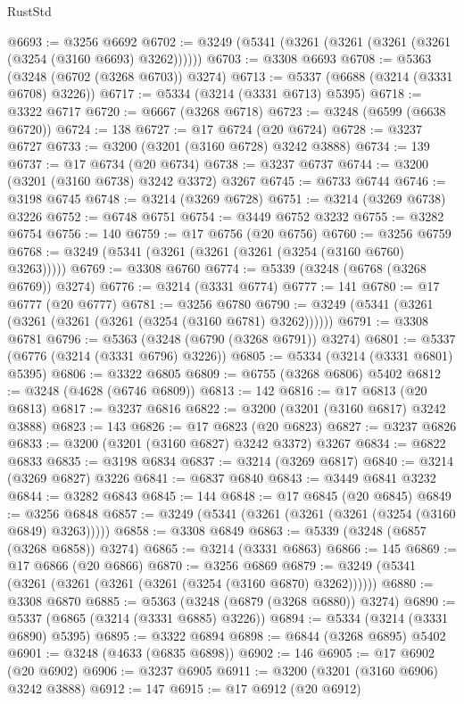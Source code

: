 \begin{lexlean}{RustStd}
\begin{coremodule}
{\begin{coremodule}
{{{{{{{{{{{{{{{{{{{{{{{{{@6693 := @3256 @6692
@6702 := @3249 (@5341 (@3261 (@3261 (@3261 (@3261 (@3254 (@3160 @6693) @3262))))))
@6703 := @3308 @6693
@6708 := @5363 (@3248 (@6702 (@3268 @6703)) @3274)
@6713 := @5337 (@6688 (@3214 (@3331 @6708) @3226))
@6717 := @5334 (@3214 (@3331 @6713) @5395)
@6718 := @3322 @6717
@6720 := @6667 (@3268 @6718)
@6723 := @3248 (@6599 (@6638 @6720))
@6724 := 138
@6727 := @17 @6724 (@20 @6724)
@6728 := @3237 @6727
@6733 := @3200 (@3201 (@3160 @6728) @3242 @3888)
@6734 := 139
@6737 := @17 @6734 (@20 @6734)
@6738 := @3237 @6737
@6744 := @3200 (@3201 (@3160 @6738) @3242 @3372) @3267
@6745 := @6733 @6744
@6746 := @3198 @6745
@6748 := @3214 (@3269 @6728)
@6751 := @3214 (@3269 @6738) @3226
@6752 := @6748 @6751
@6754 := @3449 @6752 @3232
@6755 := @3282 @6754
@6756 := 140
@6759 := @17 @6756 (@20 @6756)
@6760 := @3256 @6759
@6768 := @3249 (@5341 (@3261 (@3261 (@3261 (@3254 (@3160 @6760) @3263)))))
@6769 := @3308 @6760
@6774 := @5339 (@3248 (@6768 (@3268 @6769)) @3274)
@6776 := @3214 (@3331 @6774)
@6777 := 141
@6780 := @17 @6777 (@20 @6777)
@6781 := @3256 @6780
@6790 := @3249 (@5341 (@3261 (@3261 (@3261 (@3261 (@3254 (@3160 @6781) @3262))))))
@6791 := @3308 @6781
@6796 := @5363 (@3248 (@6790 (@3268 @6791)) @3274)
@6801 := @5337 (@6776 (@3214 (@3331 @6796) @3226))
@6805 := @5334 (@3214 (@3331 @6801) @5395)
@6806 := @3322 @6805
@6809 := @6755 (@3268 @6806) @5402
@6812 := @3248 (@4628 (@6746 @6809))
@6813 := 142
@6816 := @17 @6813 (@20 @6813)
@6817 := @3237 @6816
@6822 := @3200 (@3201 (@3160 @6817) @3242 @3888)
@6823 := 143
@6826 := @17 @6823 (@20 @6823)
@6827 := @3237 @6826
@6833 := @3200 (@3201 (@3160 @6827) @3242 @3372) @3267
@6834 := @6822 @6833
@6835 := @3198 @6834
@6837 := @3214 (@3269 @6817)
@6840 := @3214 (@3269 @6827) @3226
@6841 := @6837 @6840
@6843 := @3449 @6841 @3232
@6844 := @3282 @6843
@6845 := 144
@6848 := @17 @6845 (@20 @6845)
@6849 := @3256 @6848
@6857 := @3249 (@5341 (@3261 (@3261 (@3261 (@3254 (@3160 @6849) @3263)))))
@6858 := @3308 @6849
@6863 := @5339 (@3248 (@6857 (@3268 @6858)) @3274)
@6865 := @3214 (@3331 @6863)
@6866 := 145
@6869 := @17 @6866 (@20 @6866)
@6870 := @3256 @6869
@6879 := @3249 (@5341 (@3261 (@3261 (@3261 (@3261 (@3254 (@3160 @6870) @3262))))))
@6880 := @3308 @6870
@6885 := @5363 (@3248 (@6879 (@3268 @6880)) @3274)
@6890 := @5337 (@6865 (@3214 (@3331 @6885) @3226))
@6894 := @5334 (@3214 (@3331 @6890) @5395)
@6895 := @3322 @6894
@6898 := @6844 (@3268 @6895) @5402
@6901 := @3248 (@4633 (@6835 @6898))
@6902 := 146
@6905 := @17 @6902 (@20 @6902)
@6906 := @3237 @6905
@6911 := @3200 (@3201 (@3160 @6906) @3242 @3888)
@6912 := 147
@6915 := @17 @6912 (@20 @6912)
}}}}}}}}}}}}}}}}}}}}}}}}}
\end{coremodule}}
\end{coremodule}
\end{lexlean}
